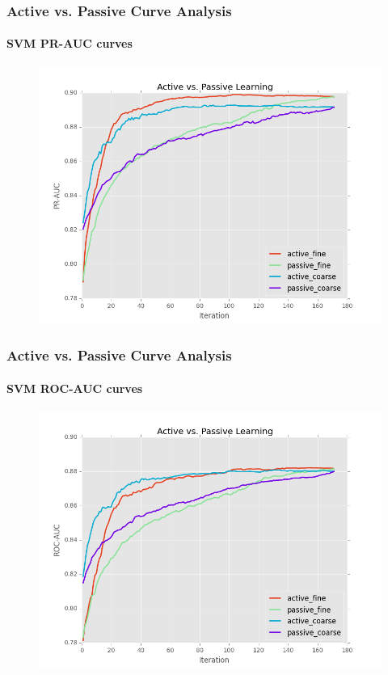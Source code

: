 \documentclass{beamer}
\begin{document}
\begin{frame}
    \frametitle{Active vs. Passive Curve Analysis}  %
    \framesubtitle{SVM PR-AUC curves}
    \begin{figure}[!htb]
        \centering
        \includegraphics[width=0.80\columnwidth]{fig/runActPassSVM_pr}
        \label{fig:ActiveVsPassivePRSVM}
    \end{figure}
\end{frame}
\begin{frame}
    \frametitle{Active vs. Passive Curve Analysis}  %
    \framesubtitle{SVM ROC-AUC curves}
    \begin{figure}[!htb]
        \centering
        \includegraphics[width=0.80\columnwidth]{fig/runActPassSVM_roc}
        \label{fig:ActiveVsPassiveROCSVM}
    \end{figure}
\end{frame}
\end{document}
